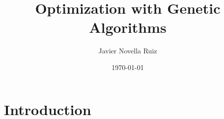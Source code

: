 \documentclass[11pt, a4paper]{article}
\title{Optimization with Genetic Algorithms}
\author{Javier Novella Ruiz}
\date{\today}
\begin{document}


\tableofcontents

\newpage

\section{Introduction}




\end{document}
